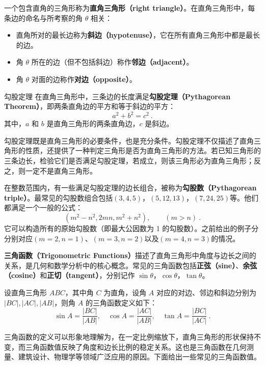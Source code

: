 一个包含直角的三角形称为\textbf{直角三角形（right triangle）}。在直角三角形中，每条边的命名与所考察的角 $\theta$ 相关：
\begin{itemize}
\item 直角所对的最长边称为\textbf{斜边（hypotenuse）}，它在所有直角三角形中都是最长的边。
\item 角 $\theta$ 所在的边（但不包括斜边）称作\textbf{邻边（adjacent）}。
\item 角 $\theta$ 对面的边称作\textbf{对边（opposite）}。
\end{itemize}

\begin{theorem}{勾股定理}
在直角三角形中，三条边的长度满足\textbf{勾股定理（Pythagorean Theorem）}，即两条直角边的平方和等于斜边的平方：
\begin{equation}
a^2 + b^2 = c^2~.
\end{equation}
其中，$a$ 和 $b$ 是直角三角形的两条直角边，$c$ 是斜边。
\end{theorem}

勾股定理既是直角三角形的必要条件，也是充分条件。勾股定理不仅描述了直角三角形的性质，还提供了一种判定三角形是否为直角三角形的方法。若已知三角形的三条边长，检验它们是否满足勾股定理，若成立，则该三角形必为直角三角形；反之，则一定不是直角三角形。

在整数范围内，有一些满足勾股定理的边长组合，被称为\textbf{勾股数（Pythagorean triple）}。最常见的勾股数组合包括$(3,4,5)$，$(5,12,13)$，$(7,24,25)$等。他们都满足一个一般的公式：
\begin{equation}
(m^2 - n^2, 2mn, m^2 + n^2),\qquad(m>n)~.
\end{equation}
它可以构造所有的原始勾股数（即最大公因数为 1 的勾股数）。之前给出的例子分分别对应$(m=2,n=1)$、$(m=3,n=2)$以及$(m=4,n=3)$的情况。

\textbf{三角函数（Trigonometric Functions）}描述了直角三角形中角度与边长之间的关系，是几何和数学分析中的核心概念。常见的三角函数包括\textbf{正弦（sine）}、\textbf{余弦（cosine）}和\textbf{正切（tangent）}，分别记作 $\sin\theta$，$\cos\theta$，$\tan\theta$。

设直角三角形 $ABC$，其中角 $C$ 为直角，设角 $A$ 对应的对边、邻边和斜边分别为 $|BC|, |AC|, |AB|$，则角 $A$ 的三角函数定义如下：
\begin{equation}\label{eq_HsGeBa_1}
\sin A = \frac{|BC|}{|AB|}, \quad
\cos A = \frac{|AC|}{|AB|}, \quad
\tan A = \frac{|BC|}{|AC|}~.
\end{equation}

三角函数的定义可以形象地理解为，在一定比例缩放下，直角三角形的形状保持不变，而三角函数值反映了角度和边长比例的稳定关系。这也是三角函数在几何测量、建筑设计、物理学等领域广泛应用的原因。下面给出一些常见的三角函数值。

